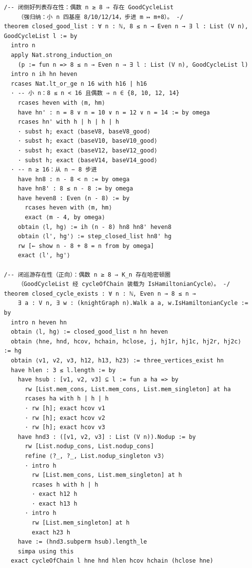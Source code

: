 \documentclass[11pt]{article}
\begin{document}
\begin{lstlisting}[caption={Verbatim lines 1589--1644: the closed-tour
induction assembly --- \texttt{closed\_good\_list} (strong induction,
bases $8/10/12/14$, step $n\mapsto n+8$) and \texttt{closed\_cycle\_exists}
(loading the good list as a Hamiltonian cycle).},label={lst:proof-closed}]
/-- 闭侧好列表存在性：偶数 n ≥ 8 ⇒ 存在 GoodCycleList
    （强归纳：小 n 四基座 8/10/12/14，步进 m ↦ m+8）。 -/
theorem closed_good_list : ∀ n : ℕ, 8 ≤ n → Even n → ∃ l : List (V n), GoodCycleList l := by
  intro n
  apply Nat.strong_induction_on
    (p := fun n => 8 ≤ n → Even n → ∃ l : List (V n), GoodCycleList l)
  intro n ih hn heven
  rcases Nat.lt_or_ge n 16 with h16 | h16
  · -- 小 n：8 ≤ n < 16 且偶数 ⇒ n ∈ {8, 10, 12, 14}
    rcases heven with ⟨m, hm⟩
    have hn' : n = 8 ∨ n = 10 ∨ n = 12 ∨ n = 14 := by omega
    rcases hn' with h | h | h | h
    · subst h; exact ⟨baseV8, baseV8_good⟩
    · subst h; exact ⟨baseV10, baseV10_good⟩
    · subst h; exact ⟨baseV12, baseV12_good⟩
    · subst h; exact ⟨baseV14, baseV14_good⟩
  · -- n ≥ 16：从 n − 8 步进
    have hn8 : n - 8 < n := by omega
    have hn8' : 8 ≤ n - 8 := by omega
    have heven8 : Even (n - 8) := by
      rcases heven with ⟨m, hm⟩
      exact ⟨m - 4, by omega⟩
    obtain ⟨l, hg⟩ := ih (n - 8) hn8 hn8' heven8
    obtain ⟨l', hg'⟩ := step_closed_list hn8' hg
    rw [← show n - 8 + 8 = n from by omega]
    exact ⟨l', hg'⟩

/-- 闭巡游存在性（正向）：偶数 n ≥ 8 ⇒ K_n 存在哈密顿圈
    （GoodCycleList 经 cycleOfChain 装载为 IsHamiltonianCycle）。 -/
theorem closed_cycle_exists : ∀ n : ℕ, Even n → 8 ≤ n →
    ∃ a : V n, ∃ w : (knightGraph n).Walk a a, w.IsHamiltonianCycle := by
  intro n heven hn
  obtain ⟨l, hg⟩ := closed_good_list n hn heven
  obtain ⟨hne, hnd, hcov, hchain, hclose, j, hj1r, hj1c, hj2r, hj2c⟩ := hg
  obtain ⟨v1, v2, v3, h12, h13, h23⟩ := three_vertices_exist hn
  have hlen : 3 ≤ l.length := by
    have hsub : [v1, v2, v3] ⊆ l := fun a ha => by
      rw [List.mem_cons, List.mem_cons, List.mem_singleton] at ha
      rcases ha with h | h | h
      · rw [h]; exact hcov v1
      · rw [h]; exact hcov v2
      · rw [h]; exact hcov v3
    have hnd3 : ([v1, v2, v3] : List (V n)).Nodup := by
      rw [List.nodup_cons, List.nodup_cons]
      refine ⟨?_, ?_, List.nodup_singleton v3⟩
      · intro h
        rw [List.mem_cons, List.mem_singleton] at h
        rcases h with h | h
        · exact h12 h
        · exact h13 h
      · intro h
        rw [List.mem_singleton] at h
        exact h23 h
    have := (hnd3.subperm hsub).length_le
    simpa using this
  exact cycleOfChain l hne hnd hlen hcov hchain (hclose hne)
\end{lstlisting}
\end{document}

